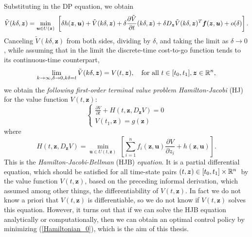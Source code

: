 Substituting in the DP equation, we obtain
\begin{equation}
\tilde{V}(k\delta,\bm{z})=\min_{\bm{u}\in U(\bm{z})}\ \left[\delta h(\bm{z},\bm{u})+\tilde{V}(k\delta,\bm{z})+\delta\frac{\partial\tilde{V}}{\partial t}(k\delta,\bm{z})\\
+\delta D_{\bm{z}}\tilde{V}(k\delta,\bm{z})^T\bm{f}(\bm{z},\bm{u})+o(\delta)\right].
\end{equation}
Canceling $\tilde{V}(k\delta,\bm{z})$ from both sides, dividing by $\delta$, and 
taking the limit as $\delta\to0$, while assuming that in the limit the discrete-time
 cost-to-go function tends to  its continuous-time counterpart,
\begin{equation*}
\lim_{k\to\infty,\delta\to0,k\delta=t}\tilde{V}(k\delta,\bm{z})=V(t,\bm{z}),\quad\text{for all}\ t\in[t_0,t_1],\bm{z}\in\mathbb{R}^n,
\end{equation*}
we obtain the \textit{following first-order terminal value problem Hamilton-Jacobi} (HJ) for the value function $V(t,\bm{z})$:
\begin{equation}
\begin{cases}
\frac{\partial V}{\partial t}+H(t,\bm{z},D_{\bm{z}}V)=0\\
V(t_1,\bm{z})=g(\bm{z})
\end{cases}
\label{The_HJB_1}
\end{equation}
where
\begin{equation}
H(t,\bm{z},D_{\bm{z}}V)=\min_{\bm{u}\in U(t,\bm{z})}\ \left[\sum_{i=1}^nf_i(\bm{z},\bm{u})\frac{\partial V}{\partial z_i}+h(\bm{z},\bm{u})\right].
\label{Hamiltonian_0}
\end{equation}
This is the \textit{Hamilton-Jacobi-Bellman} (HJB) \textit{equation}. It is a 
partial differential equation, which should be satisfied for all time-state 
pairs $(t,\bm{z})\in[t_0,t_1]\times\mathbb{R}^n$\ by the value function $V(t,\bm{z})$, 
based on the preceding informal derivation, which assumed among other things, 
the differentiability of $V(t,\bm{z})$. In fact we do not know a priori that 
$V(t,\bm{z})$ is differentiable, so we do not know if $V(t,\bm{z})$ solves 
this equation. However, it turns out that if we can solve the HJB equation 
analytically or computationally, then we can obtain an optimal control 
policy by minimizing (\ref{Hamiltonian_0}), which is the aim of this thesis.

